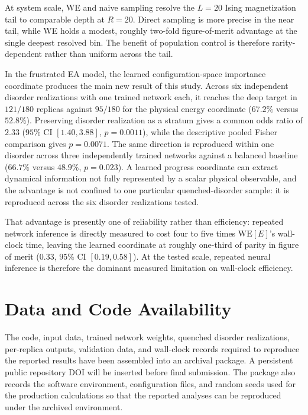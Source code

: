 \documentclass[a4paper,fleqn]{cas-sc}
\newcommand{\WE}{\mathrm{WE}}
\begin{document}
At system scale, WE and naive sampling resolve the $L=20$ Ising magnetization tail to
comparable depth at $R=20$. Direct sampling is more precise in the near tail, while WE holds a
modest, roughly two-fold figure-of-merit advantage at the single deepest resolved bin. The
benefit of population control is therefore rarity-dependent rather than uniform across the
tail.

In the frustrated EA model, the learned configuration-space importance coordinate produces the
main new result of this study. Across six independent disorder realizations with one trained
network each, it reaches the deep target in $121/180$ replicas against $95/180$ for the physical
energy coordinate ($67.2\%$ versus $52.8\%$).  Preserving disorder realization as a stratum
gives a common odds ratio of $2.33$ ($95\%$ CI $[1.40,3.88]$, $p=0.0011$), while the descriptive
pooled Fisher comparison gives $p=0.0071$.  The same direction is reproduced within one disorder
across three independently trained networks against a balanced baseline ($66.7\%$ versus
$48.9\%$, $p=0.023$).  A learned progress coordinate can extract dynamical information not
fully represented by a scalar physical observable, and the advantage is not confined to one
particular quenched-disorder sample: it is reproduced across the six disorder realizations
tested.

That advantage is presently one of reliability rather than efficiency: repeated network
inference is directly measured to cost four to five times $\WE[E]$'s wall-clock time, leaving
the learned coordinate at roughly one-third of parity in figure of merit ($0.33$, $95\%$ CI
$[0.19,0.58]$). At the tested scale, repeated neural inference is therefore the dominant measured
limitation on wall-clock efficiency.

\section*{Data and Code Availability}
The code, input data, trained network weights, quenched disorder realizations, per-replica
outputs, validation data, and wall-clock records required to reproduce the reported results have
been assembled into an archival package. A persistent public repository DOI will be inserted
before final submission. The package also records the software environment, configuration files,
and random seeds used for the production calculations so that the reported analyses can be
reproduced under the archived environment.
\end{document}
